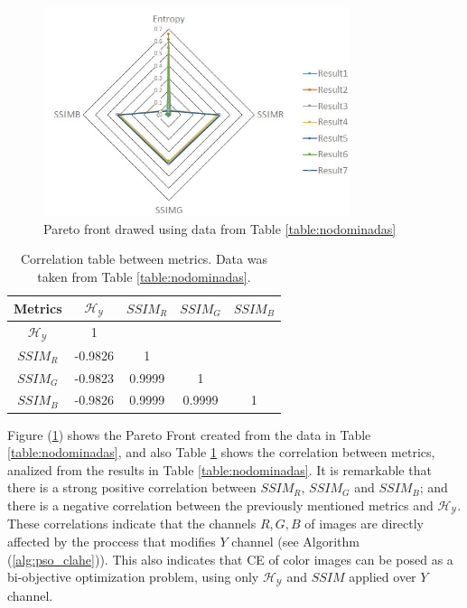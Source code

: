 \begin{figure}[H]
    \centering
        \includegraphics[width=0.80\textwidth]{./Figures/pareto_front.jpg}
    \caption{Pareto front drawed using data from Table \ref{table:nodominadas} }\label{fig:pareto_front}
\end{figure}

\begin{table}[H]
\setlength{\abovecaptionskip}{2pt plus 3pt minus 2pt} %
\caption[Parámetros de entrada para $MOPSO$]{Correlation table between metrics. Data was taken from Table \ref{table:nodominadas}.}
\begin{center}
 \begin{tabular}{||c | c c c c||} 
 \hline
Metrics & $\mathscr{H_Y}$ & $SSIM_R$ & $SSIM_G$ & $SSIM_B$ \\ 
\hline
$\mathscr{H_Y}$ & 1 &   &   &  \\ 
\hline
$SSIM_R$ & -0.9826  & 1 &  &  \\ 
\hline
$SSIM_G$ & -0.9823 & 0.9999   & 1   &  \\ 
\hline
$SSIM_B$ & -0.9826 & 0.9999   & 0.9999   & 1 \\ 
\hline
\end{tabular}
\end{center}
\label{table:correlacion}
\end{table}

Figure (\ref{fig:pareto_front}) shows the Pareto Front created from the data in Table \ref{table:nodominadas}, and also Table \ref{table:correlacion} shows the correlation between metrics, analized from the results in Table \ref{table:nodominadas}. It is remarkable that there is a strong positive correlation between $SSIM_R$, $SSIM_G$ and $SSIM_B$; and there is a negative correlation between the previously mentioned metrics and $\mathscr{H_Y}$. These correlations indicate that the channels $R,G,B$ of images are directly affected by the proccess that modifies $Y$ channel (see Algorithm (\ref{alg:pso_clahe})). This also indicates that CE of color images can be posed as a bi-objective optimization problem, using only $\mathscr{H_Y}$ and $SSIM$ applied over $Y$ channel.

